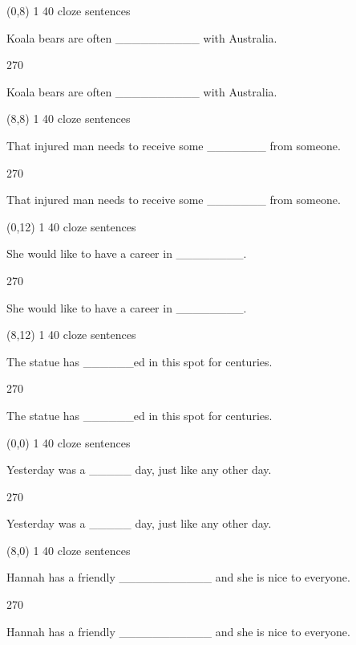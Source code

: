\documentclass[a4paper]{article}
\newenvironment{itemize*}%
{\begin{itemize}%
 \setlength{\itemsep}{0.5cm}%
 \setlength{\parsep}{0pt}%
 \setlength{\parskip}{0pt}}%
{\end{itemize}}
\newcommand{\mycard}[3]{%
	\small #1 #2
	\par
	\parbox[t][6.8cm][c]{9.5cm}{%
	\par
	\myleft{#3}
	\par
	\myright{#3}
	}
}
\newcommand{\myleft}[1]{%
	\begin{sideways}
	\hspace*{-0.9cm}
		\parbox[t][2.7cm][t]{6.5cm}{%
		\large #1
		}
	\end{sideways}
}
\newcommand{\myright}[1]{%
	\hspace*{6.5cm}
	\begin{turn}{270}
	\hspace*{-7.1cm}
		\parbox[t][2.7cm][t]{6.5cm}{%
		\large #1
		}
	\end{turn}
}
\begin{document}
\begin{textblock}{8}(0,8)
\mycard{1}{40 cloze sentences}{
\begin{itemize*}
\item Koala bears are often \_\_\_\_\_\_\_\_\_\_ with Australia.
\end{itemize*}
}
\end{textblock}

\begin{textblock}{8}(8,8)
\mycard{1}{40 cloze sentences}{
\begin{itemize*}
\item That injured man needs to receive some \_\_\_\_\_\_\_ from someone.
\end{itemize*}
}
\end{textblock}

\begin{textblock}{8}(0,12)
\mycard{1}{40 cloze sentences}{
\begin{itemize*}
\item She would like to have a career in \_\_\_\_\_\_\_\_.
\end{itemize*}
}
\end{textblock}

\begin{textblock}{8}(8,12)
\mycard{1}{40 cloze sentences}{
\begin{itemize*}
\item The statue has \_\_\_\_\_\_ed in this spot for centuries.
\end{itemize*}
}
\end{textblock}

\null
\newpage

\begin{textblock}{8}(0,0)
\mycard{1}{40 cloze sentences}{
\begin{itemize*}
\item Yesterday was a \_\_\_\_\_ day, just like any other day.
\end{itemize*}
}
\end{textblock}

\begin{textblock}{8}(8,0)
\mycard{1}{40 cloze sentences}{
\begin{itemize*}
\item Hannah has a friendly \_\_\_\_\_\_\_\_\_\_\_ and she is nice to everyone.
\end{itemize*}
}
\end{textblock}
\end{document}
